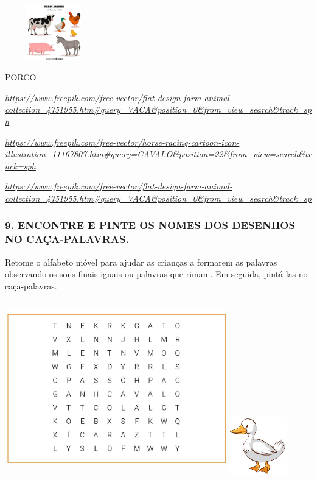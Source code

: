 \includegraphics[width=1.66606in,height=0.94389in]{media/image27.jpg}

PORCO

\href{https://www.freepik.com/free-vector/flat-design-farm-animal-collection_4751955.htm\#query=VACA\&position=0\&from_view=search\&track=sph}{\emph{https://www.freepik.com/free-vector/flat-design-farm-animal-collection\_4751955.htm\#query=VACA\&position=0\&from\_view=search\&track=sph}}

\href{https://www.freepik.com/free-vector/horse-racing-cartoon-icon-illustration_11167807.htm\#query=CAVALO\&position=22\&from_view=search\&track=sph}{\emph{https://www.freepik.com/free-vector/horse-racing-cartoon-icon-illustration\_11167807.htm\#query=CAVALO\&position=22\&from\_view=search\&track=sph}}

\href{https://www.freepik.com/free-vector/flat-design-farm-animal-collection_4751955.htm\#query=VACA\&position=0\&from_view=search\&track=sp}{\emph{https://www.freepik.com/free-vector/flat-design-farm-animal-collection\_4751955.htm\#query=VACA\&position=0\&from\_view=search\&track=sp}}

\subsubsection{9. ENCONTRE E PINTE OS NOMES DOS DESENHOS NO CAÇA-PALAVRAS.}\label{encontre-e-pinte-no-cauxe7a-palavras-os-nomes-dos-desenhos.}

\protect\hypertarget{_heading=h.1fob9te}{}{}Retome o alfabeto móvel para
ajudar as crianças a formarem as palavras observando os sons
finais iguais ou palavras que rimam. Em seguida, pintá-las no caça-palavras.

\includegraphics[width=3.83611in,height=2.98958in]{media/image29.jpg}\includegraphics[width=1.00625in,height=0.99857in]{media/image30.png}

